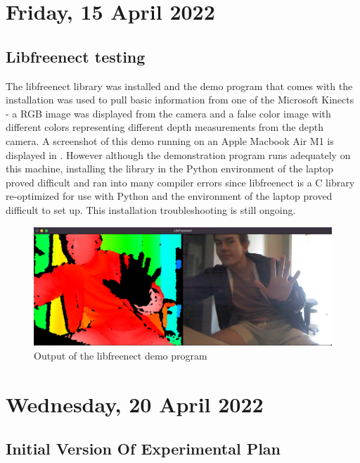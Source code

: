 \section[2022/04/15]{Friday, 15 April 2022}

\subsection{Libfreenect testing}

The libfreenect library was installed and the demo program that comes with the installation was used to pull basic information from one of the Microsoft Kinects - a RGB image was displayed from the camera and a false color image with different colors representing different depth measurements from the depth camera. A screenshot of this demo running on an Apple Macbook Air M1 is displayed in . However although the demonstration program runs adequately on this machine, installing the library in the Python environment of the laptop proved difficult and ran into many compiler errors since libfreenect is a C library re-optimized for use with Python and the environment of the laptop proved difficult to set up. This installation troubleshooting is still ongoing. \newline

\begin{figure}[h]
    \centering
    \includegraphics[width=0.8\linewidth]{figures/kinect_demo.png}
    \caption{Output of the libfreenect demo program}
    \label{fig:kinect_demo}
\end{figure}

\section[2022/04/20]{Wednesday, 20 April 2022}

\subsection{Initial Version Of Experimental Plan}


